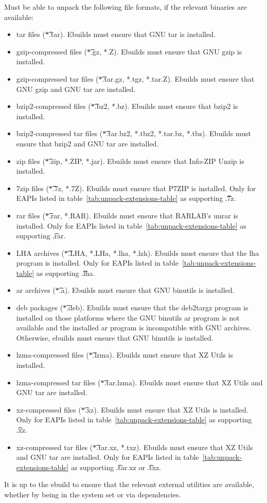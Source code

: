 \begin{description}
     Must be able to unpack the following file formats, if the
    relevant binaries are available:
    \begin{itemize}
    \item tar files (\t{*.tar}). Ebuilds must ensure that GNU tar is installed.
    \item gzip-compressed files (\t{*.gz, *.Z}). Ebuilds must ensure that GNU gzip is installed.
    \item gzip-compressed tar files (\t{*.tar.gz, *.tgz, *.tar.Z}). Ebuilds must ensure that
        GNU gzip and GNU tar are installed.
    \item bzip2-compressed files (\t{*.bz2, *.bz}). Ebuilds must ensure that bzip2 is installed.
    \item bzip2-compressed tar files (\t{*.tar.bz2, *.tbz2, *.tar.bz, *.tbz}). Ebuilds must ensure
        that bzip2 and GNU tar are installed.
    \item zip files (\t{*.zip, *.ZIP, *.jar}). Ebuilds must ensure that Info-ZIP Unzip is installed.
    \item 7zip files (\t{*.7z, *.7Z}). Ebuilds must ensure that P7ZIP is installed. Only for EAPIs
        listed in table~\ref{tab:unpack-extensions-table} as supporting \t{.7z}.
    \item rar files (\t{*.rar, *.RAR}). Ebuilds must ensure that RARLAB's unrar is installed.
        Only for EAPIs listed in table~\ref{tab:unpack-extensions-table} as supporting \t{.rar}.
    \item LHA archives (\t{*.LHA, *.LHa, *.lha, *.lzh}). Ebuilds must ensure that the lha program is
        installed. Only for EAPIs listed in table~\ref{tab:unpack-extensions-table} as supporting
        \t{.lha}.
    \item ar archives (\t{*.a}). Ebuilds must ensure that GNU binutils is installed.
    \item deb packages (\t{*.deb}). Ebuilds must ensure that the deb2targz program is installed on
        those platforms where the GNU binutils ar program is not available and the installed ar
        program is incompatible with GNU archives. Otherwise, ebuilds must ensure that GNU binutils
        is installed.
    \item lzma-compressed files (\t{*.lzma}). Ebuilds must ensure that XZ Utils is installed.
    \item lzma-compressed tar files (\t{*.tar.lzma}). Ebuilds must ensure that XZ Utils and GNU tar
        are installed.
    \item xz-compressed files (\t{*.xz}). Ebuilds must ensure that XZ Utils is installed. Only for
        EAPIs listed in table~\ref{tab:unpack-extensions-table} as supporting \t{.xz}.
    \item xz-compressed tar files (\t{*.tar.xz, *.txz}). Ebuilds must ensure that XZ Utils and
        GNU tar are installed. Only for EAPIs listed in table~\ref{tab:unpack-extensions-table} as
        supporting \t{.tar.xz} or \t{.txz}.
    \end{itemize}
    It is up to the ebuild to ensure that the relevant external utilities are available, whether by
    being in the system set or via dependencies.


\end{description}
